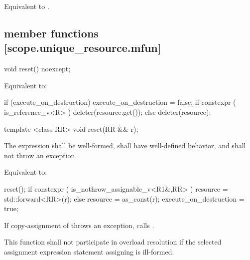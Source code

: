 \documentclass[ebook,11pt,article]{memoir}
\begin{document}
\begin{itemdescr}
\pnum
\effects 
Equivalent to .
\end{itemdescr}

\newpage
\subsection { member functions [scope.unique_resource.mfun]}

\begin{itemdecl}
void reset() noexcept;
\end{itemdecl}

\begin{itemdescr}
\pnum
\effects
Equivalent to:
\begin{codeblock}
if (execute_on_destruction) {
    execute_on_destruction = false;
    if constexpr ( is_reference_v<R> ) 
        deleter(resource.get());
    else 
        deleter(resource);
}
\end{codeblock}
\end{itemdescr}

\begin{itemdecl}
template <class RR>
void reset(RR && r);
\end{itemdecl}

\begin{itemdescr}
\pnum
\requires
The expression  shall be well-formed, shall have well-defined behavior, and shall not throw an exception.

\pnum
\effects 
Equivalent to:
\begin{codeblock}
reset();
if constexpr ( is_nothrow_assignable_v<R1&,RR> )
    resource = std::forward<RR>(r);
else
    resource = as_const(r);
execute_on_destruction = true;
\end{codeblock}

If copy-assignment of  throws an exception, calls .

\pnum
\remarks This function  shall not participate in overload resolution if the selected assignment expression statement assigning  is ill-formed.
\end{itemdescr}



\end{document}
